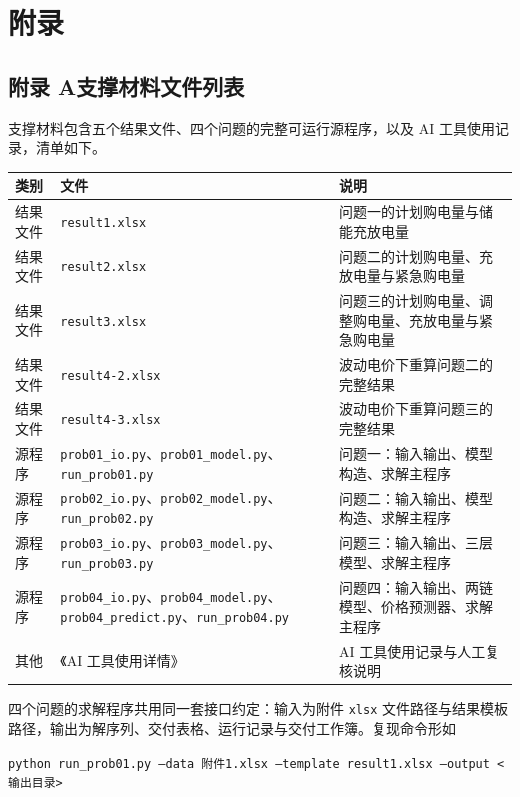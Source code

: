 \section*{附录}

\subsection*{附录 A\quad 支撑材料文件列表}

支撑材料包含五个结果文件、四个问题的完整可运行源程序，以及 AI 工具使用记录，清单如下。

\begin{center}
\small
\begin{tabular}{p{2.6cm}p{6.4cm}p{5.4cm}}
\toprule
类别 & 文件 & 说明 \\
\midrule
结果文件 & \texttt{result1.xlsx} & 问题一的计划购电量与储能充放电量 \\
结果文件 & \texttt{result2.xlsx} & 问题二的计划购电量、充放电量与紧急购电量 \\
结果文件 & \texttt{result3.xlsx} & 问题三的计划购电量、调整购电量、充放电量与紧急购电量 \\
结果文件 & \texttt{result4-2.xlsx} & 波动电价下重算问题二的完整结果 \\
结果文件 & \texttt{result4-3.xlsx} & 波动电价下重算问题三的完整结果 \\
源程序 & \texttt{prob01\_io.py}、\texttt{prob01\_model.py}、\texttt{run\_prob01.py} & 问题一：输入输出、模型构造、求解主程序 \\
源程序 & \texttt{prob02\_io.py}、\texttt{prob02\_model.py}、\texttt{run\_prob02.py} & 问题二：输入输出、模型构造、求解主程序 \\
源程序 & \texttt{prob03\_io.py}、\texttt{prob03\_model.py}、\texttt{run\_prob03.py} & 问题三：输入输出、三层模型、求解主程序 \\
源程序 & \texttt{prob04\_io.py}、\texttt{prob04\_model.py}、\texttt{prob04\_predict.py}、\texttt{run\_prob04.py} & 问题四：输入输出、两链模型、价格预测器、求解主程序 \\
其他 & 《AI 工具使用详情》 & AI 工具使用记录与人工复核说明 \\
\bottomrule
\end{tabular}
\end{center}

四个问题的求解程序共用同一套接口约定：输入为附件 \texttt{xlsx} 文件路径与结果模板路径，输出为解序列、交付表格、运行记录与交付工作簿。复现命令形如

\begin{center}
\small
\texttt{python run\_prob01.py --data 附件1.xlsx --template result1.xlsx --output <输出目录>}
\end{center}

